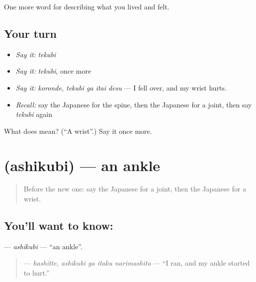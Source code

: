 \begin{grammarlens}[title={What you've built}]
One more word for describing what you lived and felt.
\end{grammarlens}

\subsection*{Your turn}
\begin{itemize}
\raggedright
  \item \emph{Say it:} \emph{tekubi}
  \item \emph{Say it:} \emph{tekubi}, once more
  \item \emph{Say it:} \emph{koronde, tekubi ga itai desu} — I fell over, and my wrist hurts.
  \item \emph{Recall:} say the Japanese for the spine, then the Japanese for a joint, then say \emph{tekubi} again
\end{itemize}

\begin{tcolorbox}[breakable,colback=teal!4,colframe=teal!35!black,title={Before you move on}]
What does  mean? (\textquotedblleft{}A wrist\textquotedblright{}.) Say it once more.
\end{tcolorbox}
\section[\texorpdfstring{\ja{あしくび} (ashikubi)}{あしくび (ashikubi)}]{ (ashikubi) — an ankle}

\label{lesson:JA-C443-ashikubi}



\begin{quote}
Before the new one: say the Japanese for a joint, then the Japanese for a wrist.
\end{quote}

\subsection*{You'll want to know: }
\textbf{} — \emph{ashikubi} — \textquotedblleft{}an ankle\textquotedblright{}.

\begin{quote}
\textbf{  } — \emph{hashitte, ashikubi ga itaku narimashita} — \textquotedblleft{}I ran, and my ankle started to hurt.\textquotedblright{}
\end{quote}

